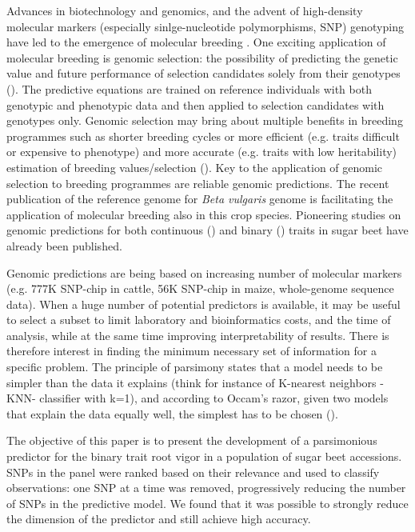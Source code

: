 Advances in biotechnology and genomics, and the advent of high-density
molecular markers (especially sinlge-nucleotide polymorphisms, SNP)
genotyping have led to the emergence of molecular breeding
\cite{moose2008molecular}.
One exciting application of molecular breeding is genomic selection: the possibility of predicting the genetic value and future
performance of selection candidates solely from their genotypes (\cite{meuwissen2001prediction}). The predictive equations are
trained on reference individuals with both genotypic and phenotypic data and then
applied to selection candidates with genotypes only. Genomic selection
may bring about multiple benefits in breeding programmes such as
shorter breeding cycles or more efficient (e.g. traits difficult or
expensive to phenotype) and more accurate (e.g. traits with low
heritability) estimation of breeding values/selection
(\cite{goddard2007genomic,heffner2010plant}).
Key to the application of genomic selection to breeding programmes are reliable genomic
predictions.
The recent publication of the reference genome for \emph{Beta
vulgaris} genome \cite{dohm2013genome} is facilitating the application
of molecular breeding also in this crop species. Pioneering studies on
genomic predictions for both continuous (\cite{hofheinz2012genome,wurschum2013genomic}) and binary
(\cite{biscarini2014genome}) traits in sugar beet have already been published.

Genomic predictions are being based on increasing number of molecular
markers (e.g. 777K SNP-chip in cattle, 56K SNP-chip in maize,
whole-genome sequence data). When a huge number of potential predictors
is available, it may be useful to select a subset to limit laboratory
and bioinformatics costs, and the time of analysis, while at the same
time improving interpretability of results. There is therefore interest
in finding the minimum necessary set of information for a specific
problem. The principle of parsimony states that
a model needs to be simpler than the data it explains (think for
instance of K-nearest neighbors -KNN- classifier with k=1), and according to Occam's razor, given two models that explain the data
equally well, the simplest has to be chosen (\cite{chaitin2006limits}).

The objective of this paper is to present the development of a
parsimonious predictor for the binary trait root vigor in a population
of sugar beet accessions.
SNPs in the panel were ranked based on their relevance and used to classify observations: one SNP at a
time was removed, progressively reducing the number of SNPs in the
predictive model.
We found that it was possible to strongly reduce the dimension of the
predictor and still achieve high accuracy.


